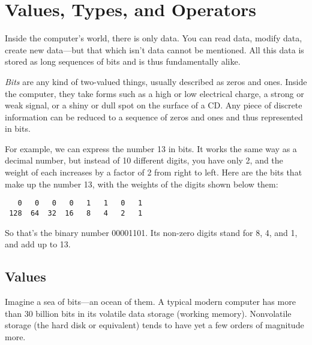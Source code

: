 \chapter{Values, Types, and Operators}\label{values}


Inside the computer's world, there is only data. You can read data, modify data, create new data—but that which isn't data cannot be mentioned. All this data is stored as long sequences of bits and is thus fundamentally alike.

\emph{Bits} are any kind of two-valued things, usually described as zeros and ones. Inside the computer, they take forms such as a high or low electrical charge, a strong or weak signal, or a shiny or dull spot on the surface of a CD. Any piece of discrete information can be reduced to a sequence of zeros and ones and thus represented in bits.

For example, we can express the number 13 in bits. It works the same way as a decimal number, but instead of 10 different digits, you have only 2, and the weight of each increases by a factor of 2 from right to left. Here are the bits that make up the number 13, with the weights of the digits shown below them:

\begin{lstlisting}
   0   0   0   0   1   1   0   1
 128  64  32  16   8   4   2   1
\end{lstlisting}
\noindent

So that's the binary number 00001101. Its non-zero digits stand for 8, 4, and 1, and add up to 13.

\section{Values}

Imagine a sea of bits—an ocean of them. A typical modern computer has more than 30 billion bits in its volatile data storage (working memory). Nonvolatile storage (the hard disk or equivalent) tends to have yet a few orders of magnitude more.

